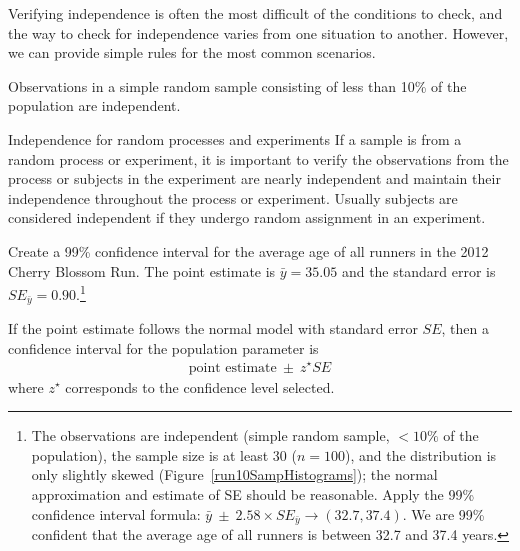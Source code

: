 Verifying independence is often the most difficult of the conditions to check, and the way to check for independence varies from one situation to another. However, we can provide simple rules for the most common scenarios. 

\begin{tipBox}{
Observations in a simple random sample consisting of less than 10\% of the population are independent.}
\end{tipBox}

\begin{caution}
{Independence for random processes and experiments}
{If a sample is from a random process or experiment, it is important to verify the observations from the process or subjects in the experiment are nearly independent and maintain their independence throughout the process or experiment. Usually subjects are considered independent if they undergo random assignment in an experiment.}
\end{caution}


\begin{exercise} \label{find99CIForRun10AgeExercise}
Create a 99\% confidence interval for the average age of all runners in the 2012 Cherry Blossom Run. The point estimate is $\bar{y} = 35.05$ and the standard error is $SE_{\bar{y}} = 0.90$.\footnote{The observations are independent (simple random sample, $<10\%$ of the population), the sample size is at least 30 ($n=100$), and the distribution is only slightly skewed (Figure~\ref{run10SampHistograms}); the normal approximation and estimate of SE should be reasonable. Apply the 99\% confidence interval formula: $\bar{y}\ \pm\ 2.58 \times  SE_{\bar{y}} \rightarrow (32.7, 37.4)$. We are 99\% confident that the average age of all runners is between 32.7 and 37.4 years.}
\end{exercise}

\begin{termBox}{
If the point estimate follows the normal model with standard error $SE$, then a confidence interval for the population parameter is
\begin{eqnarray*}
\text{point estimate}\ \pm\ z^{\star} SE
\end{eqnarray*}
where $z^{\star}$ corresponds to the confidence level selected.}
\end{termBox}

